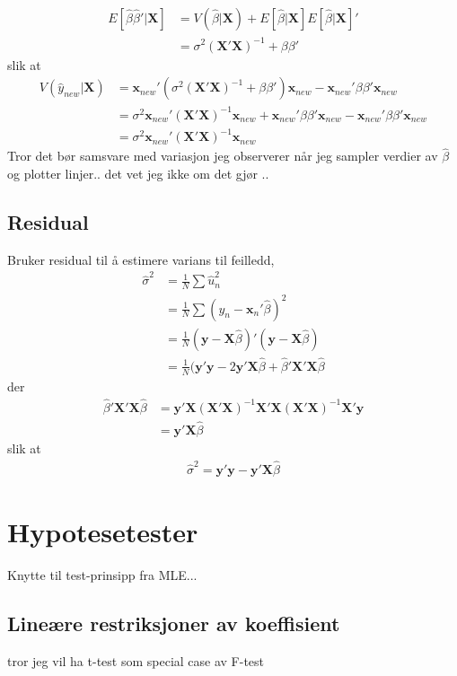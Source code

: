 \begin{align}
E[\hat{\beta}\hat{\beta}'|\mathbf{X}] &= V(\hat{\beta}|\mathbf{X})+E[\hat{\beta}|\mathbf{X}]E[\hat{\beta}|\mathbf{X}]' \\
&= \sigma^2(\mathbf{X'}\mathbf{X})^{-1} + \beta\beta'
\end{align}
slik at
\begin{align}
V(\hat{y}_{new}|\mathbf{X}) &=\mathbf{x}_{new}'(\sigma^2(\mathbf{X'}\mathbf{X})^{-1} + \beta\beta')\mathbf{x}_{new} -\mathbf{x}_{new}'\beta\beta'\mathbf{x}_{new} \\
&=\sigma^2\mathbf{x}_{new}'(\mathbf{X'}\mathbf{X})^{-1}\mathbf{x}_{new} + \mathbf{x}_{new}'\beta\beta'\mathbf{x}_{new}-\mathbf{x}_{new}'\beta\beta'\mathbf{x}_{new} \\
&=\sigma^2\mathbf{x}_{new}'(\mathbf{X'}\mathbf{X})^{-1}\mathbf{x}_{new}
 \end{align}
Tror det bør samsvare med variasjon jeg observerer når jeg sampler verdier av $\hat{\beta}$ og plotter linjer.. det vet jeg ikke om det gjør .. 
\subsection{Residual}
Bruker residual til å estimere varians til feilledd,
\begin{align}
\hat{\sigma}^2 &= \frac{1}{N}\sum\hat{u}_n^2 \\
&= \frac{1}{N}\sum(y_n-\mathbf{x}_n'\hat{\beta})^2 \\
&= \frac{1}{N}(\mathbf{y}-\mathbf{X}\hat{\beta})'(\mathbf{y}-\mathbf{X}\hat{\beta}) \\
&= \frac{1}{N}(\mathbf{y}'\mathbf{y}-2\mathbf{y}'\mathbf{X}\hat{\beta} + \hat{\beta}'\mathbf{X}'\mathbf{X}\hat{\beta}
\end{align}
der 
\begin{align}
\hat{\beta}'\mathbf{X}'\mathbf{X}\hat{\beta} &= \mathbf{y}'\mathbf{X}(\mathbf{X}'\mathbf{X})^{-1}\mathbf{X}'\mathbf{X}(\mathbf{X}'\mathbf{X})^{-1}\mathbf{X}'\mathbf{y} \\
&=\mathbf{y}'\mathbf{X}\hat{\beta}
\end{align}
slik at
\begin{align}
\hat{\sigma}^2 = \mathbf{y}'\mathbf{y}-\mathbf{y}'\mathbf{X}\hat{\beta}
\end{align}
\section{Hypotesetester}
Knytte til test-prinsipp fra MLE...
\subsection{Lineære restriksjoner av koeffisient}
tror jeg vil ha t-test som special case av F-test
